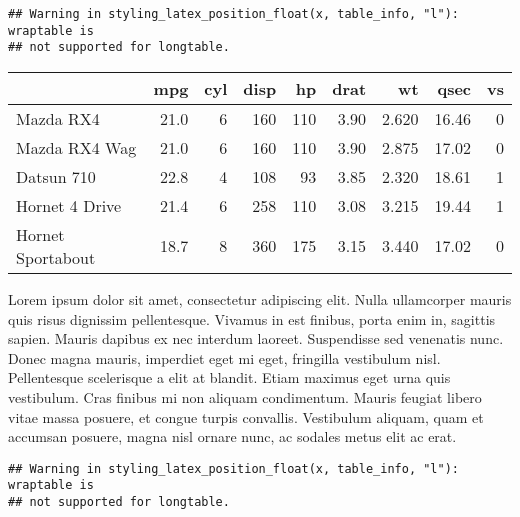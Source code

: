 \documentclass[]{article}
\newenvironment{Shaded}{\begin{snugshade}}{\end{snugshade}}
\newcommand{\KeywordTok}[1]{\textcolor[rgb]{0.13,0.29,0.53}{\textbf{{#1}}}}
\newcommand{\DataTypeTok}[1]{\textcolor[rgb]{0.13,0.29,0.53}{{#1}}}
\newcommand{\DecValTok}[1]{\textcolor[rgb]{0.00,0.00,0.81}{{#1}}}
\newcommand{\StringTok}[1]{\textcolor[rgb]{0.31,0.60,0.02}{{#1}}}
\newcommand{\NormalTok}[1]{{#1}}
\begin{document}
\begin{verbatim}
## Warning in styling_latex_position_float(x, table_info, "l"): wraptable is
## not supported for longtable.
\end{verbatim}

\begingroup\fontsize{6}{8}\selectfont
{}

\begin{longtable}[l]{lrrrrrrrr}
\toprule
  & mpg & cyl & disp & hp & drat & wt & qsec & vs\\
\midrule
Mazda RX4 & 21.0 & 6 & 160 & 110 & 3.90 & 2.620 & 16.46 & 0\\
Mazda RX4 Wag & 21.0 & 6 & 160 & 110 & 3.90 & 2.875 & 17.02 & 0\\
Datsun 710 & 22.8 & 4 & 108 & 93 & 3.85 & 2.320 & 18.61 & 1\\
Hornet 4 Drive & 21.4 & 6 & 258 & 110 & 3.08 & 3.215 & 19.44 & 1\\
Hornet Sportabout & 18.7 & 8 & 360 & 175 & 3.15 & 3.440 & 17.02 & 0\\
\bottomrule
\end{longtable}

\endgroup

Lorem ipsum dolor sit amet, consectetur adipiscing elit. Nulla
ullamcorper mauris quis risus dignissim pellentesque. Vivamus in est
finibus, porta enim in, sagittis sapien. Mauris dapibus ex nec interdum
laoreet. Suspendisse sed venenatis nunc. Donec magna mauris, imperdiet
eget mi eget, fringilla vestibulum nisl. Pellentesque scelerisque a elit
at blandit. Etiam maximus eget urna quis vestibulum. Cras finibus mi non
aliquam condimentum. Mauris feugiat libero vitae massa posuere, et
congue turpis convallis. Vestibulum aliquam, quam et accumsan posuere,
magna nisl ornare nunc, ac sodales metus elit ac erat.

\begin{Shaded}
\end{Shaded}

\begin{verbatim}
## Warning in styling_latex_position_float(x, table_info, "l"): wraptable is
## not supported for longtable.
\end{verbatim}
\end{document}
